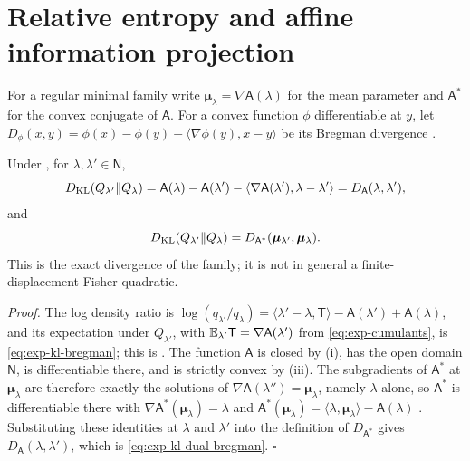 \section{Relative entropy and affine information projection}
\label{sec:exp-information-projection}

For a regular minimal family write
\(\boldsymbol\mu_\lambda=\nabla\mathsf A(\lambda)\) for the mean parameter and
\(\mathsf A^\ast\) for the convex conjugate of \(\mathsf A\). For a convex
function \(\phi\) differentiable at \(y\), let
\(D_\phi(x,y)=\phi(x)-\phi(y)-\langle\nabla\phi(y),x-y\rangle\) be its Bregman
divergence \citep{Bregman1967}.

Under , for \(\lambda,\lambda'\in\mathsf N\),
\begin{equation}
D_{\mathrm{KL}}(Q_{\lambda'}\Vert Q_\lambda)
=\mathsf A(\lambda)-\mathsf A(\lambda')
-\langle\nabla\mathsf A(\lambda'),\lambda-\lambda'\rangle
=D_{\mathsf A}(\lambda,\lambda'),
\label{eq:exp-kl-bregman}
\end{equation}
and
\begin{equation}
D_{\mathrm{KL}}(Q_{\lambda'}\Vert Q_\lambda)
=D_{\mathsf A^\ast}(\boldsymbol\mu_{\lambda'},\boldsymbol\mu_\lambda).
\label{eq:exp-kl-dual-bregman}
\end{equation}
This is the exact divergence of the family; it is not in general a
finite-displacement Fisher quadratic. 

\noindent\emph{Proof.}
The log density ratio is
\(\log(q_{\lambda'}/q_\lambda)=\langle\lambda'-\lambda,\mathsf T\rangle
-\mathsf A(\lambda')+\mathsf A(\lambda)\), and its expectation under
\(Q_{\lambda'}\), with \(\mathbb E_{\lambda'}\mathsf T=\nabla\mathsf A(\lambda')\)
from \eqref{eq:exp-cumulants}, is \eqref{eq:exp-kl-bregman}; this is
\citet[Proposition~6.3]{Brown1986}. The function \(\mathsf A\) is closed by
(i), has the open domain \(\mathsf N\), is
differentiable there, and is strictly convex by
(iii). The subgradients of \(\mathsf A^\ast\)
at \(\boldsymbol\mu_\lambda\) are therefore exactly the solutions of
\(\nabla\mathsf A(\lambda'')=\boldsymbol\mu_\lambda\), namely \(\lambda\)
alone, so \(\mathsf A^\ast\) is differentiable there with
\(\nabla\mathsf A^\ast(\boldsymbol\mu_\lambda)=\lambda\) and
\(\mathsf A^\ast(\boldsymbol\mu_\lambda)=\langle\lambda,\boldsymbol\mu_\lambda\rangle
-\mathsf A(\lambda)\) \citep[Theorems~23.5 and~25.1]{Rockafellar1970}.
Substituting these identities at \(\lambda\) and \(\lambda'\) into the
definition of \(D_{\mathsf A^\ast}\) gives \(D_{\mathsf A}(\lambda,\lambda')\),
which is \eqref{eq:exp-kl-dual-bregman}. \(\square\)

